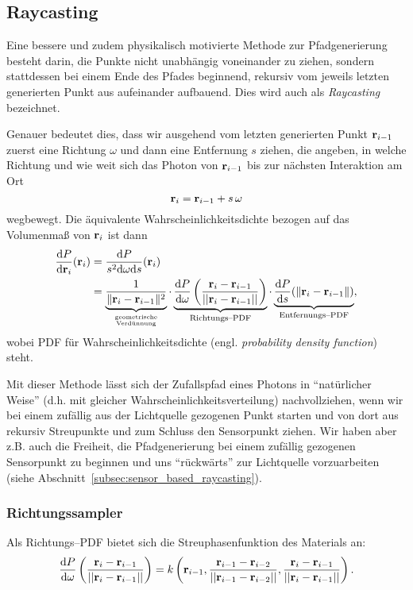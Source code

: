 	\subsection{Raycasting}
	Eine bessere und zudem physikalisch motivierte Methode zur Pfadgenerierung besteht darin, die Punkte nicht unabhängig voneinander zu ziehen, sondern stattdessen bei einem Ende des Pfades beginnend, rekursiv vom jeweils letzten generierten Punkt aus aufeinander aufbauend. Dies wird auch als {\em Raycasting} bezeichnet.
	
	Genauer bedeutet dies, dass wir ausgehend vom letzten generierten Punkt $\mathbf{r}_{i-1}$ zuerst eine Richtung $\omega$ und dann eine Entfernung $s$ ziehen, die angeben, in welche Richtung und wie weit sich das Photon von $\mathbf{r}_{i-1}$ bis zur nächsten Interaktion am Ort
	$$\mathbf{r}_i=\mathbf{r}_{i-1}+s\,\omega$$
	wegbewegt.
	Die äquivalente Wahrscheinlichkeitsdichte bezogen auf das Volumenmaß von $\mathbf{r}_i$ ist dann
	\begin{align*}
		\frac{\text{d}P}{\text{d}\mathbf{r}_i}(\mathbf{r}_i) &= \frac{\text{d}P}{s^2 \text{d}\omega\text{d}s}(\mathbf{r}_i) \\
		&= \underbrace{\frac{1}{\|\mathbf{r}_i - \mathbf{r}_{i-1}\|^2}}_{\text{geometrische}\atop\text{Verdünnung}} \cdot\underbrace{\frac{\text{d}P}{\text{d}\omega}\left(\frac{\mathbf{r}_i - \mathbf{r}_{i-1}}{||\mathbf{r}_i - \mathbf{r}_{i-1}||}\right)}_{\text{Richtungs--PDF}} \cdot \underbrace{\frac{\text{d}P}{\text{d}s}(\|\mathbf{r}_i-\mathbf{r}_{i-1}\|)}_{\text{Entfernungs--PDF}},
	\end{align*}
	wobei PDF für Wahrscheinlichkeitsdichte (engl. {\em probability density function}) steht.

	Mit dieser Methode lässt sich der Zufallspfad eines Photons in ``natürlicher Weise'' (d.h. mit gleicher Wahrscheinlichkeitsverteilung) nachvollziehen, wenn wir bei einem zufällig aus der Lichtquelle gezogenen Punkt starten und von dort aus rekursiv Streupunkte und zum Schluss den Sensorpunkt ziehen. Wir haben aber z.B. auch die Freiheit, die Pfadgenerierung bei einem zufällig gezogenen Sensorpunkt zu beginnen und uns ``rückwärts'' zur Lichtquelle vorzuarbeiten (siehe Abschnitt~\ref{subsec:sensor_based_raycasting}).
	
	\subsubsection{Richtungssampler}
	Als Richtungs--PDF bietet sich die Streuphasenfunktion des Materials an:
	\begin{equation*}
		\frac{\text{d}P}{\text{d}\omega}\left(\frac{\mathbf{r}_i - \mathbf{r}_{i-1}}{||\mathbf{r}_i - \mathbf{r}_{i-1}||}\right) = k\left(\mathbf{r}_{i-1},\frac{\mathbf{r}_{i-1} - \mathbf{r}_{i-2}}{||\mathbf{r}_{i-1} - \mathbf{r}_{i-2}||},\frac{\mathbf{r}_i - \mathbf{r}_{i-1}}{||\mathbf{r}_i - \mathbf{r}_{i-1}||}\right).
		\label{eq:direction_pdf}
	\end{equation*}
	
